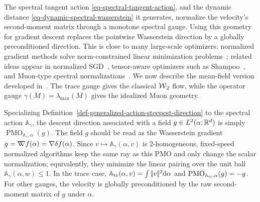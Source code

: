 The spectral tangent action \eqref{eq-spectral-tangent-action}, and the dynamic distance \eqref{eq-dynamic-spectral-wasserstein} it generates, normalize the velocity's second-moment matrix through a monotone spectral gauge. Using this geometry for gradient descent replaces the pointwise Wasserstein direction by a globally preconditioned direction. This is close to many large-scale optimizers: normalized gradient methods solve norm-constrained linear minimization problems~\cite{PethickXieAntonakopoulosEtAl2025}; related ideas appear in normalized SGD~\cite{MurraySwensonKar2019,CutkoskyMehta2020}, tensor-aware optimizers such as Shampoo~\cite{GuptaKorenSinger2018}, and Muon-type spectral normalizations~\cite{KellerJordan2024,LiuSuYaoEtAl2025}. We now describe the mean-field version developed in~\cite{peyre2026muon}. The trace gauge gives the classical $\operatorname{\mathcal{W}}_2$ flow, while the operator gauge $\gamma(M)=\lambda_{\max}(M)$ gives the idealized Muon geometry.

Specializing Definition~\ref{def-generalized-action-steepest-direction} to the spectral action \(\mathbb A_\gamma\), the descent direction associated with a field \(g\in L^2(\alpha;\mathbb{R}^d)\) is simply \(\operatorname{PMO}_{\mathbb A_\gamma,\alpha}(g)\).
The field \(g\) should be read as the Wasserstein gradient \(g=\mathord{\nabla\mkern-9.3mu\nabla} f(\alpha)=\nabla\delta f(\alpha)\). Since \(v\mapsto\mathbb A_\gamma(\alpha,v)\) is \(2\)-homogeneous, fixed-speed normalized algorithms keep the same ray as this PMO and only change the scalar normalization; equivalently, they minimize the linear pairing over the unit ball \(\mathbb A_\gamma(\alpha,w)\leq1\). In the trace case, \(\mathbb A_{\operatorname{tr}}(\alpha,v)=\int|\!| v |\!|^2\mathrm{d}\alpha\) and \(\operatorname{PMO}_{\mathbb A_{\operatorname{tr}},\alpha}(g)=-g\). For other gauges, the velocity is globally preconditioned by the raw second-moment matrix of \(g\) under \(\alpha\).


